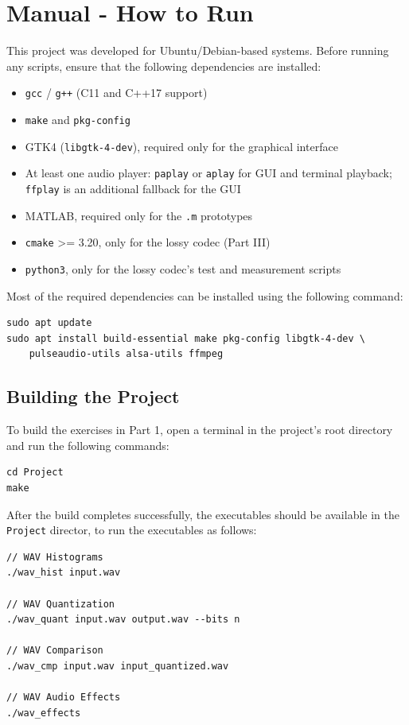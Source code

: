\chapter{Manual - How to Run}

This project was developed for Ubuntu/Debian-based systems.
Before running any scripts, ensure that the following dependencies
are installed:

\begin{itemize}
    \item \texttt{gcc} / \texttt{g++} (C11 and C++17 support)
    \item \texttt{make} and \texttt{pkg-config}
    \item GTK4 (\texttt{libgtk-4-dev}), required only for the graphical interface
    \item At least one audio player: \texttt{paplay} or \texttt{aplay}
    for GUI and terminal playback; \texttt{ffplay} is an additional
    fallback for the GUI
    \item MATLAB, required only for the \texttt{.m} prototypes
    \item \texttt{cmake} >= 3.20, only for the lossy codec (Part III)
    \item \texttt{python3}, only for the lossy codec's test and measurement scripts
\end{itemize}

Most of the required dependencies can be installed using the following
command:

\begin{verbatim}
sudo apt update
sudo apt install build-essential make pkg-config libgtk-4-dev \
    pulseaudio-utils alsa-utils ffmpeg
\end{verbatim}

\section{Building the Project}

To build the exercises in Part 1, open a terminal in the project's
root directory and run the following commands:

\begin{verbatim}
cd Project
make
\end{verbatim}

After the build completes successfully, the executables
should be available in the \texttt{Project} director, to run the executables as follows:

\begin{verbatim}
// WAV Histograms
./wav_hist input.wav

// WAV Quantization
./wav_quant input.wav output.wav --bits n

// WAV Comparison
./wav_cmp input.wav input_quantized.wav

// WAV Audio Effects
./wav_effects
\end{verbatim}


